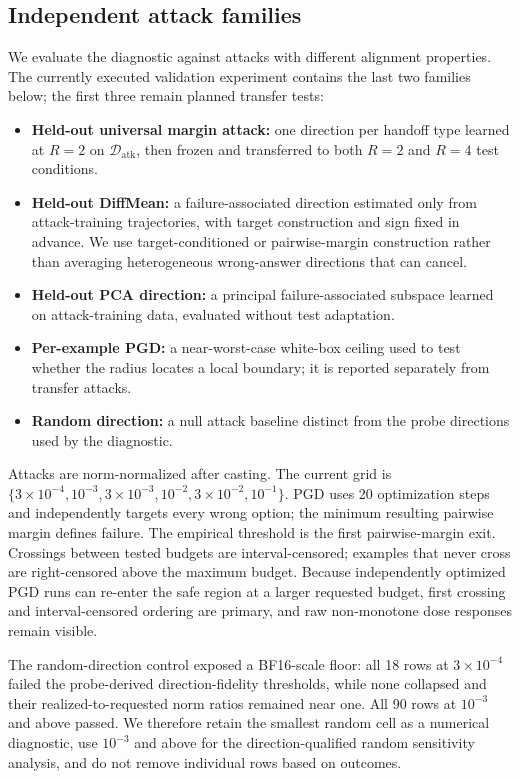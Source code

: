 \documentclass[11pt]{article}
\begin{document}
\subsection{Independent attack families}

We evaluate the diagnostic against attacks with different alignment properties.
The currently executed validation experiment contains the last two families
below; the first three remain planned transfer tests:
\begin{itemize}
    \item \textbf{Held-out universal margin attack:} one direction per handoff
    type learned at $R=2$ on $\mathcal D_{\mathrm{atk}}$, then frozen and
    transferred to both $R=2$ and $R=4$ test conditions.
    \item \textbf{Held-out DiffMean:} a failure-associated direction estimated
    only from attack-training trajectories, with target construction and sign
    fixed in advance. We use target-conditioned or pairwise-margin construction
    rather than averaging heterogeneous wrong-answer directions that can cancel.
    \item \textbf{Held-out PCA direction:} a principal failure-associated
    subspace learned on attack-training data, evaluated without test adaptation.
    \item \textbf{Per-example PGD:} a near-worst-case white-box ceiling used to
    test whether the radius locates a local boundary; it is reported separately
    from transfer attacks.
    \item \textbf{Random direction:} a null attack baseline distinct from the
    probe directions used by the diagnostic.
\end{itemize}
Attacks are norm-normalized after casting. The current grid is
$\{3\times10^{-4},10^{-3},3\times10^{-3},10^{-2},3\times10^{-2},10^{-1}\}$.
PGD uses 20 optimization steps and independently targets every wrong option;
the minimum resulting pairwise margin defines failure. The empirical threshold
is the first pairwise-margin exit. Crossings between tested budgets are
interval-censored; examples that never cross are right-censored above the
maximum budget. Because independently optimized PGD runs can re-enter the safe
region at a larger requested budget, first crossing and interval-censored
ordering are primary, and raw non-monotone dose responses remain visible.

The random-direction control exposed a BF16-scale floor: all 18 rows at
$3\times10^{-4}$ failed the probe-derived direction-fidelity thresholds, while
none collapsed and their realized-to-requested norm ratios remained near one.
All 90 rows at $10^{-3}$ and above passed. We therefore retain the smallest
random cell as a numerical diagnostic, use $10^{-3}$ and above for the
direction-qualified random sensitivity analysis, and do not remove individual
rows based on outcomes.
\end{document}
